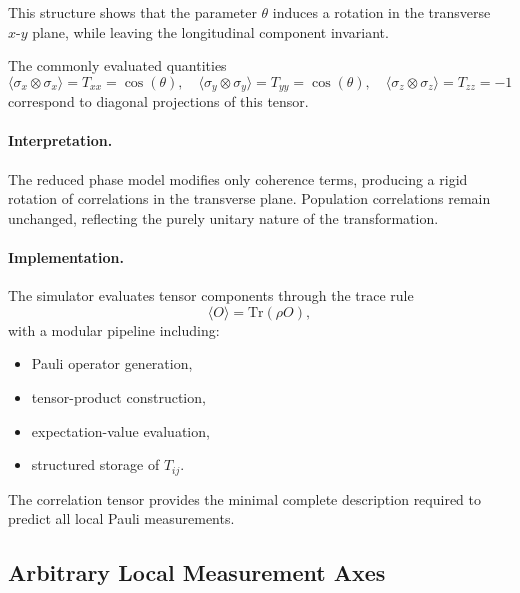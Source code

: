 \documentclass[a4paper]{article}
\begin{document}
\medskip

This structure shows that the parameter \( \theta \) induces a rotation in the transverse \( x\text{-}y \) plane, while leaving the longitudinal component invariant.

The commonly evaluated quantities
\[
\langle \sigma_x \otimes \sigma_x \rangle = T_{xx} = \cos(\theta), \quad
\langle \sigma_y \otimes \sigma_y \rangle = T_{yy} = \cos(\theta), \quad
\langle \sigma_z \otimes \sigma_z \rangle = T_{zz} = -1
\]
correspond to diagonal projections of this tensor.

\medskip

\paragraph{Interpretation.}

The reduced phase model modifies only coherence terms, producing a rigid rotation of correlations in the transverse plane. Population correlations remain unchanged, reflecting the purely unitary nature of the transformation.

\medskip

\paragraph{Implementation.}

The simulator evaluates tensor components through the trace rule
\[
\langle O \rangle = \mathrm{Tr}(\rho O),
\]
with a modular pipeline including:
\begin{itemize}
\item Pauli operator generation,
\item tensor-product construction,
\item expectation-value evaluation,
\item structured storage of \( T_{ij} \).
\end{itemize}

The correlation tensor provides the minimal complete description required to predict all local Pauli measurements.


\subsection{Arbitrary Local Measurement Axes}
\end{document}
